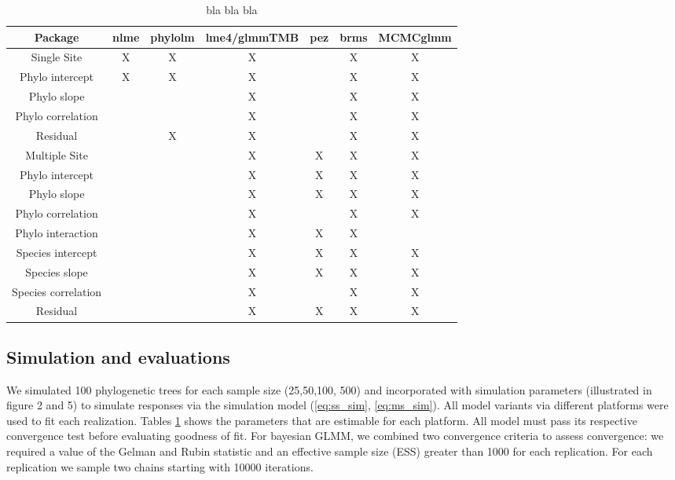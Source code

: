 \documentclass[12pt]{article}
\begin{document}
\begin{table}
\begin{tabularx}{\textwidth}{|c||c|c|c|c|c|c|}
\hline
Package	& \small{nlme}	& \small{phylolm}	& \small{lme4/glmmTMB} & \small{pez} & \small{brms} & \small{MCMCglmm} \\
\hline
\hline
Single Site & X & X & X & & X & X \\
\hline
Phylo intercept & X & X & X &  & X & X \\
Phylo slope &  &  & X &  & X & X \\
Phylo correlation &  &  & X &  & X & X \\
Residual & & X & X &  & X & X \\
\hline
\hline
Multiple Site &  &  & X & X & X & X \\
\hline
Phylo intercept &  &  & X & X & X & X \\
Phylo slope &  &  & X & X & X & X \\
Phylo correlation &  &  & X &  & X & X \\
Phylo interaction & &  & X & X & X &  \\
Species intercept & &  & X & X & X & X \\
Species slope & & & X & X & X & X \\
Species correlation & &  & X &  & X & X \\
Residual & &  & X & X & X & X \\
\hline
\end{tabularx}
\caption{bla bla bla \label{model_variant}}
\end{table}

\subsection{Simulation and evaluations}
We simulated 100 phylogenetic trees for each sample size (25,50,100, 500) and incorporated with simulation parameters (illustrated in figure 2 and 5) to simulate responses via the simulation model (\ref{eq:ss_sim}, \ref{eq:ms_sim}).
All model variants via different platforms were used to fit each realization.
Tables \ref{model_variant} shows the parameters that are estimable for each platform. 
All model must pass its respective convergence test before evaluating goodness of fit. 
For bayesian GLMM, we combined two convergence criteria to assess convergence: we required a value of the
Gelman and Rubin statistic and an effective sample size (ESS) greater than 1000 for each replication. 
For each replication we sample two chains starting with 10000 iterations. 
\end{document}
